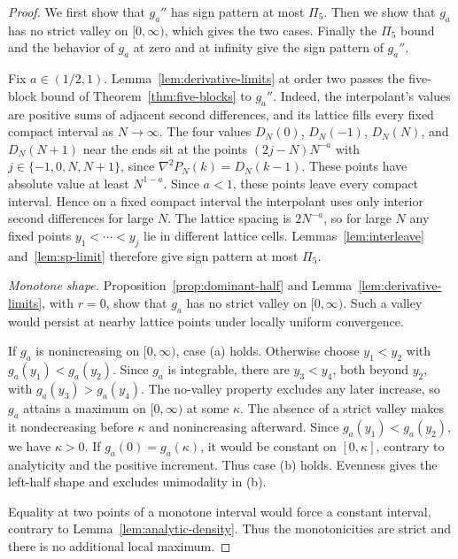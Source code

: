 \begin{proof}
We first show that $g_a''$ has sign pattern at most $\Pi_5$. Then we show
that $g_a$ has no strict valley on $[0,\infty)$, which gives the two
cases. Finally the $\Pi_5$ bound and the behavior of $g_a$ at zero and
at infinity give the sign pattern of $g_a''$.

Fix $a\in(1/2,1)$. Lemma~\ref{lem:derivative-limits} at order two
passes the five-block bound of Theorem~\ref{thm:five-blocks} to
$g_a''$. Indeed, the interpolant's values are positive sums of
adjacent second differences, and its lattice fills every fixed
compact interval as $N\to\infty$. The four values $D_N(0)$, $D_N(-1)$,
$D_N(N)$, and $D_N(N+1)$ near the ends sit at the points
$(2j-N)N^{-a}$ with $j\in\{-1,0,N,N+1\}$, since $\nabla^2P_N(k)=D_N(k-1)$.
These points have absolute value at least $N^{1-a}$. Since $a<1$, these points leave every compact
interval. Hence on a fixed compact interval the interpolant uses only
interior second differences for large $N$. The lattice spacing is
$2N^{-a}$, so for large $N$ any fixed points $y_1<\cdots<y_j$ lie in
different lattice cells. Lemmas~\ref{lem:interleave}
and~\ref{lem:sp-limit} therefore give sign pattern at most $\Pi_5$.


\emph{Monotone shape.} Proposition~\ref{prop:dominant-half} and
Lemma~\ref{lem:derivative-limits}, with $r=0$, show that $g_a$
has no strict valley on $[0,\infty)$. Such a valley would persist
at nearby lattice points under locally uniform convergence.

If $g_a$ is nonincreasing on $[0,\infty)$, case (a)
holds. Otherwise choose $y_1<y_2$ with $g_a(y_1)<g_a(y_2)$.
Since $g_a$ is integrable, there are $y_3<y_4$, both beyond $y_2$, with
$g_a(y_3)>g_a(y_4)$. The no-valley property excludes any later increase,
so $g_a$ attains a maximum on $[0,\infty)$ at some $\kappa$.
The absence of a strict valley makes it nondecreasing before
$\kappa$ and nonincreasing afterward. Since $g_a(y_1)<g_a(y_2)$, we have
$\kappa>0$. If $g_a(0)=g_a(\kappa)$,
it would be constant on $[0,\kappa]$, contrary to analyticity
and the positive increment. Thus case (b) holds.
Evenness gives the left-half shape and excludes unimodality in (b).

Equality at two points of a monotone interval would force a constant
interval, contrary to Lemma~\ref{lem:analytic-density}. Thus the
monotonicities are strict and there is no additional local maximum.


\end{proof}
